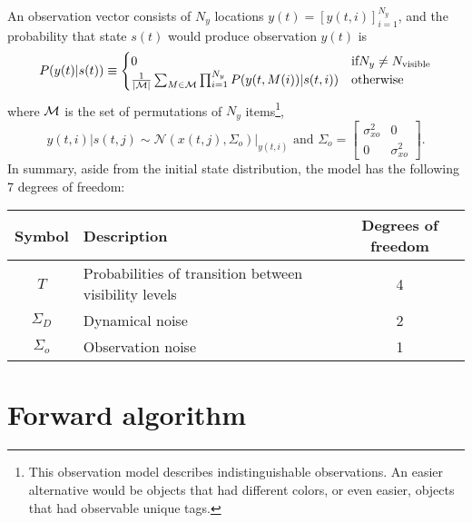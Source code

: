 \documentclass[12pt]{article}
\newcommand{\NormalE}[3]{{\mathcal{N}}\left.\left(#1,#2\right)\right|_{#3}}
\newcommand{\M}{{\cal M}}
\newcommand{\os}[4]{{\left[ #1(#2) \right]}_{#3}^{#4}} %
\newcommand{\ti}[2]{{#1}{(#2)}}                         %
\begin{document}
An observation vector consists of $N_y$ locations
$\ti{y}{t}=\os{y}{t,i}{i=1}{N_y}$, and the probability that state $\ti{s}{t}$
would produce observation $\ti{y}{t}$ is
\begin{equation}
  \label{eq:ob}
  P(\ti{y}{t}|\ti{s}{t}) \equiv
  \begin{cases}
    0 & \text{if} N_y \neq N_{\text{visible}} \\
    \frac{1}{\left|\M \right|} \sum_{M \in \M}
    \prod_{i=1}^{N_y} P(\ti{y}{t,M(i)}|\ti{s}{t,i}) & \text{otherwise}
  \end{cases}
\end{equation}
where $\M$ is the set of permutations of $N_y$ items\footnote{This
  observation model describes indistinguishable observations.  An
  easier alternative would be objects that had different colors, or
  even easier, objects that had observable unique tags.},
\begin{equation*}
  \ti{y}{t,i}|\ti{s}{t,j} \sim
  \NormalE{\ti{x}{t,j}}{\Sigma_o}{\ti{y}{t,i}} \text{ and }
  \Sigma_o = \begin{bmatrix} \sigma_{xo}^2 & 0 \\ 0 &
    \sigma_{xo}^2 \end{bmatrix}.
\end{equation*}
In summary, aside from the initial state distribution, the model has
the following 7 degrees of freedom:
\begin{center}
  \begin{tabular}{|cp{15em}c|}
    \hline
    Symbol & Description & Degrees of freedom \\
    \hline
    $T$ & Probabilities of transition between visibility levels & 4 \\
    $\Sigma_D$ & Dynamical noise & 2 \\
    $\Sigma_o$ & Observation noise & 1 \\
    \hline
  \end{tabular} 
\end{center}

\section{Forward algorithm}
\label{sec:forward}
\end{document}
